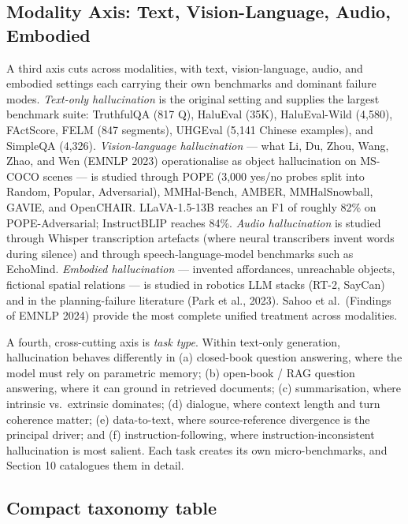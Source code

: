 \subsection{Modality Axis: Text, Vision-Language, Audio, Embodied}\label{modality-axis-text-vision-language-audio-embodied}

A third axis cuts across modalities, with text, vision-language, audio, and embodied settings each carrying their own benchmarks and dominant failure modes. \emph{Text-only hallucination} is the original setting and supplies the largest benchmark suite: TruthfulQA (817 Q), HaluEval (35K), HaluEval-Wild (4,580), FActScore, FELM (847 segments), UHGEval (5,141 Chinese examples), and SimpleQA (4,326). \emph{Vision-language hallucination} --- what Li, Du, Zhou, Wang, Zhao, and Wen (EMNLP 2023) operationalise as object hallucination on MS-COCO scenes --- is studied through POPE (3,000 yes/no probes split into Random, Popular, Adversarial), MMHal-Bench, AMBER, MMHalSnowball, GAVIE, and OpenCHAIR. LLaVA-1.5-13B reaches an F1 of roughly 82\% on POPE-Adversarial; InstructBLIP reaches 84\%. \emph{Audio hallucination} is studied through Whisper transcription artefacts (where neural transcribers invent words during silence) and through speech-language-model benchmarks such as EchoMind. \emph{Embodied hallucination} --- invented affordances, unreachable objects, fictional spatial relations --- is studied in robotics LLM stacks (RT-2, SayCan) and in the planning-failure literature (Park et al., 2023). Sahoo et al.~(Findings of EMNLP 2024) provide the most complete unified treatment across modalities.

A fourth, cross-cutting axis is \emph{task type}. Within text-only generation, hallucination behaves differently in (a) closed-book question answering, where the model must rely on parametric memory; (b) open-book / RAG question answering, where it can ground in retrieved documents; (c) summarisation, where intrinsic vs.~extrinsic dominates; (d) dialogue, where context length and turn coherence matter; (e) data-to-text, where source-reference divergence is the principal driver; and (f) instruction-following, where instruction-inconsistent hallucination is most salient. Each task creates its own micro-benchmarks, and Section 10 catalogues them in detail.

\subsection{Compact taxonomy table}\label{compact-taxonomy-table}

